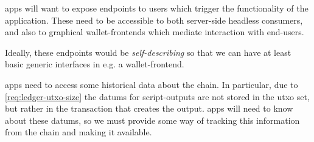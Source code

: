 \begin{requirement}
\label{req:app-client-interfaces}
\Glspl{app} will want to expose endpoints to users which trigger the functionality of the application.
These need to be accessible to both server-side headless consumers, and also to graphical \glspl{wallet-frontend} which mediate interaction with end-users.

Ideally, these endpoints would be \emph{self-describing} so that we can have at least basic generic interfaces in e.g. a \gls{wallet-frontend}.
\end{requirement}

\begin{requirement}
\label{req:app-chain-data}
\Glspl{app} need to access some historical data about the chain.
In particular, due to \cref{req:ledger-utxo-size} the \glspl{datum} for \glspl{script-output} are not stored in the \gls{utxo} set, but rather in the transaction that creates the output.
\Glspl{app} will need to know about these \glspl{datum}, so we must provide some way of tracking this information from the chain and making it available.

\end{requirement}

